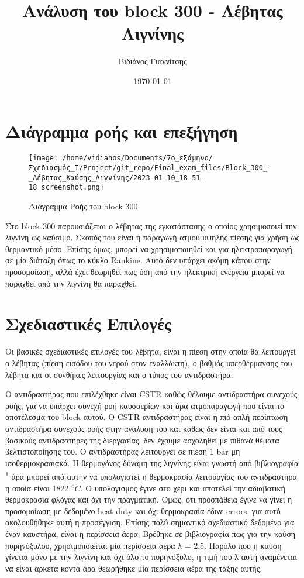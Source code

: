 \documentclass[11pt]{article}
\author{Βιδιάνος Γιαννίτσης}
\date{\today}
\title{Ανάλυση του block 300 - Λέβητας Λιγνίνης}
\makeatletter
\newcommand{\citeprocitem}[2]{\hyper@linkstart{cite}{citeproc_bib_item_#1}#2\hyper@linkend}
\makeatother
\begin{document}
\maketitle
\tableofcontents

\renewcommand{\abstractname}{Περίληψη}
\renewcommand{\tablename}{Πίνακας}
\renewcommand{\figurename}{Σχήμα}
\renewcommand\listingscaption{Κώδικας}

\section{Διάγραμμα ροής και επεξήγηση}
\label{sec:orgcc79510}
\begin{figure}[htbp]
\centering
\texttt{[image: /home/vidianos/Documents/7o\_εξάμηνο/Σχεδιασμός\_Ι/Project/git\_repo/Final\_exam\_files/Block\_300\_-\_Λέβητας\_Καύσης\_Λιγνίνης/2023-01-10\_18-51-18\_screenshot.png]}
\caption{Διάγραμμα Ροής του block 300}
\end{figure}

Στο block 300 παρουσιάζεται ο λέβητας της εγκατάστασης ο οποίος χρησιμοποιεί την λιγνίνη ως καύσιμο. Σκοπός του είναι η παραγωγή ατμού υψηλής πίεσης για χρήση ως θερμαντικό μέσο. Επίσης όμως, μπορεί να χρησιμοποιηθεί και για ηλεκτροπαραγωγή σε μία διάταξη όπως το κύκλο Rankine. Αυτό δεν υπάρχει ακόμη κάπου στην προσομοίωση, αλλά έχει θεωρηθεί πως όση από την ηλεκτρική ενέργεια μπορεί να παραχθεί από την λιγνίνη θα παραχθεί.

\section{Σχεδιαστικές Επιλογές}
\label{sec:org7a35905}
Οι βασικές σχεδιαστικές επιλογές του λέβητα, είναι η πίεση στην οποία θα λειτουργεί ο λέβητας (πίεση εισόδου του νερού στον εναλλάκτη), ο βαθμός υπερθέρμανσης του λέβητα και οι συνθήκες λειτουργίας και ο τύπος του αντιδραστήρα.

Ο αντιδραστήρας που επιλέχθηκε είναι CSTR καθώς θέλουμε αντιδραστήρα συνεχούς ροής, για να υπάρχει συνεχή ροή καυσαερίων και άρα ατμοπαραγωγή που είναι το αποτέλεσμα του block αυτού. Ο CSTR αντιδραστήρας είναι η πιό απλή περίπτωση αντιδραστήρα συνεχούς ροής στην ανάλυση του και καθώς δεν είναι και από τους βασικούς αντιδραστήρες της διεργασίας, δεν έχουμε ασχοληθεί με πιθανά θέματα βελτιστοποίησης του. Ο αντιδραστήρας λειτουργεί σε πίεση 1 bar μη ισοθερμοκρασιακά. Η θερμογόνος δύναμη της λιγνίνης είναι γνωστή από βιβλιογραφία \textsuperscript{\citeprocitem{1}{1}} άρα μπορεί από αυτήν να υπολογιστεί η θερμοκρασία λειτουργίας του αντιδραστήρα η οποία είναι 1822 \(^oC\). Ο υπολογισμός έγινε στο χέρι και αποτελεί την αδιαβατική θερμοκρασία φλόγας και όχι την πραγματική. Όμως, ότι προσπάθεια έγινε να γίνει η προσομοίωση με δεδομένο heat duty και όχι θερμοκρασία έδινε errors, για αυτό ακολουθήθηκε αυτή η προσέγγιση. Επίσης πολύ σημαντικό σχεδιαστικό δεδομένο για έναν καυστήρα, είναι η περίσσεια άερα. Βρέθηκε σε βιβλιογραφία πως για την καύση πυρηνόξυλου, χρησιμοποιείται μία περίσσεια αέρα λ = 2.5. Παρόλο που η καύση γίνεται μόνο με την λιγνίνη και όχι όλο το πυρηνόξυλο, η τιμή του λ αυτή αναμένεται να είναι αρκετά κοντά άρα θεωρήθηκε μία περίσσεια αέρα της τάξης αυτής.
\end{document}
